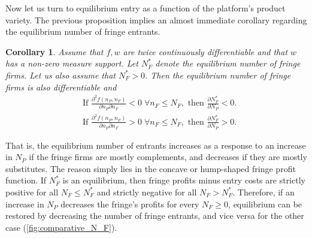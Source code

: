 \documentclass[a4paper]{article}
\newtheorem{corollary}{Corollary}
\begin{document}
Now let us turn to equilibrium entry as a function of the platform's product variety.
The previous proposition implies an almost immediate corollary regarding the equilibrium number of fringe entrants.
\begin{corollary}
    \label{cor:fringe_entry}
    Assume that $f, w$ are twice continuously differentiable and that $w$ has a non-zero measure support.
    Let $N_F^*$ denote the equilibrium number of fringe firms.
    Let us also assume that $N_F^* > 0$.
    Then the equilibrium number of fringe firms is also differentiable and
    \begin{align*}
        &\text{If } \frac{\partial^2 f(n_P, n_F)}{\partial n_P \partial n_F} < 0 \;\forall n_F \leq N_F, \text{ then } \frac{\partial N_F^*}{\partial N_P} < 0. \\
        &\text{If } \frac{\partial^2 f(n_P, n_F)}{\partial n_P \partial n_F} > 0 \;\forall n_F \leq N_F, \text{ then } \frac{\partial N_F^*}{\partial N_P} > 0.
    \end{align*}
\end{corollary}
That is, the equilibrium number of entrants increases as a response to an increase in $N_P$ if the fringe firms are mostly complements, and decreases if they are mostly substitutes.
The reason simply lies in the concave or hump-shaped fringe profit function.
If $N_F^*$ is an equilibrium, then fringe profits minus entry costs are strictly positive for all $N_F \leq N_F^*$ and strictly negative for all $N_F > N_F^*$.
Therefore, if an increase in $N_P$ decreases the fringe's profits for every $N_F \geq 0$, equilibrium can be restored by decreasing the number of fringe entrants, and vice versa for the other case (\cref{fig:comparative_N_F}).
\end{document}
